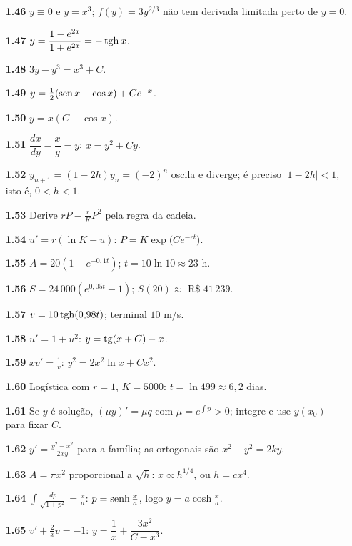 {\begin{multicols}{2}
\begin{itemize}[leftmargin=2.7em,labelsep=0.5em,itemsep=1pt]
\item[\textbf{1.46}] $y\equiv0$ e $y=x^3$; $f(y)=3y^{2/3}$ não tem derivada limitada perto de $y=0$.
\item[\textbf{1.47}] $y=\dfrac{1-e^{2x}}{1+e^{2x}}=-\operatorname{tgh} x$.
\item[\textbf{1.48}] $3y-y^3=x^3+C$.
\item[\textbf{1.49}] $y=\tfrac12(\operatorname{sen} x-\cos x)+Ce^{-x}$.
\item[\textbf{1.50}] $y=x(C-\cos x)$.
\item[\textbf{1.51}] $\dfrac{dx}{dy}-\dfrac xy=y$: $x=y^2+Cy$.
\item[\textbf{1.52}] $y_{n+1}=(1-2h)y_n=(-2)^n$ oscila e diverge; é preciso $|1-2h|<1$, isto é, $0<h<1$.
\item[\textbf{1.53}] Derive $rP-\tfrac rKP^2$ pela regra da cadeia.
\item[\textbf{1.54}] $u'=r(\ln K-u)$: $P=K\exp\big(Ce^{-rt}\big)$.
\item[\textbf{1.55}] $A=20(1-e^{-0{,}1t})$; $t=10\ln10\approx23$ h.
\item[\textbf{1.56}] $S=24\,000(e^{0{,}05t}-1)$; $S(20)\approx$ R\$ $41\,239$.
\item[\textbf{1.57}] $v=10\operatorname{tgh}(0{,}98t)$; terminal $10$ m/s.
\item[\textbf{1.58}] $u'=1+u^2$: $y=\operatorname{tg}(x+C)-x$.
\item[\textbf{1.59}] $xv'=\tfrac1v$: $y^2=2x^2\ln x+Cx^2$.
\item[\textbf{1.60}] Logística com $r=1$, $K=5000$: $t=\ln499\approx6{,}2$ dias.
\item[\textbf{1.61}] Se $y$ é solução, $(\mu y)'=\mu q$ com $\mu=e^{\int p}>0$; integre e use $y(x_0)$ para fixar $C$.
\item[\textbf{1.62}] $y'=\tfrac{y^2-x^2}{2xy}$ para a família; as ortogonais são $x^2+y^2=2ky$.
\item[\textbf{1.63}] $A=\pi x^2$ proporcional a $\sqrt h$: $x\propto h^{1/4}$, ou $h=cx^4$.
\item[\textbf{1.64}] $\int\tfrac{dp}{\sqrt{1+p^2}}=\tfrac xa$: $p=\operatorname{senh}\tfrac xa$, logo $y=a\cosh\tfrac xa$.
\item[\textbf{1.65}] $v'+\tfrac2xv=-1$: $y=\dfrac1x+\dfrac{3x^2}{C-x^3}$.
\end{itemize}\end{multicols}}
